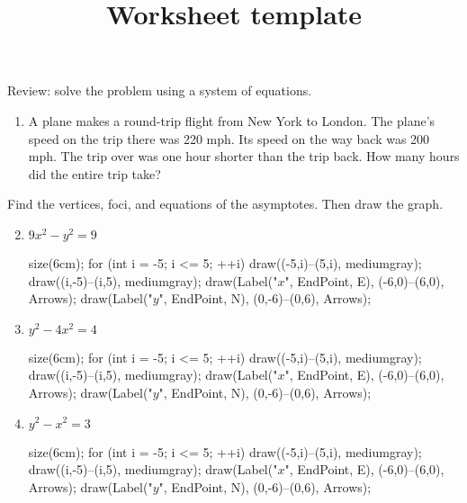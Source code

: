 \documentclass[12pt]{article}
\title{Worksheet template}
\begin{document}
\bigskip
\bigskip

Review: solve the problem using a system of equations.

\begin{enumerate}
	\item A plane makes a round-trip flight from New York to London.  The plane's speed on the trip 
    	there was 220 mph.  Its speed on the way back was 200 mph.  The trip over was one hour shorter 
        than the trip back.  How many hours did the entire trip take?
\end{enumerate}

Find the vertices, foci, and equations of the asymptotes. Then draw the graph.

\begin{multicols}{2}
\begin{enumerate}
\setcounter{enumi}{1}

	\item $9x^2 - y^2 = 9$
    
	\begin{flushleft}
	\begin{asy}
	size(6cm);
	for (int i = -5; i <= 5; ++i)
	{
    	draw((-5,i)--(5,i), mediumgray);
	    draw((i,-5)--(i,5), mediumgray);
    }
	draw(Label("$x$", EndPoint, E), (-6,0)--(6,0), Arrows);
	draw(Label("$y$", EndPoint, N), (0,-6)--(0,6), Arrows);
	\end{asy}
	\end{flushleft}

	\item $y^2 - 4x^2 = 4$ 
    
	\begin{flushleft}
	\begin{asy}
	size(6cm);
	for (int i = -5; i <= 5; ++i)
	{
    	draw((-5,i)--(5,i), mediumgray);
	    draw((i,-5)--(i,5), mediumgray);
    }
	draw(Label("$x$", EndPoint, E), (-6,0)--(6,0), Arrows);
	draw(Label("$y$", EndPoint, N), (0,-6)--(0,6), Arrows);
	\end{asy}
	\end{flushleft}

	\item $y^2 - x^2 = 3$ 
	\begin{flushleft}
	\begin{asy}
	size(6cm);
	for (int i = -5; i <= 5; ++i)
	{
    	draw((-5,i)--(5,i), mediumgray);
	    draw((i,-5)--(i,5), mediumgray);
    }
	draw(Label("$x$", EndPoint, E), (-6,0)--(6,0), Arrows);
	draw(Label("$y$", EndPoint, N), (0,-6)--(0,6), Arrows);
	\end{asy}
	\end{flushleft}


\end{enumerate}
\end{multicols}
\end{document}
